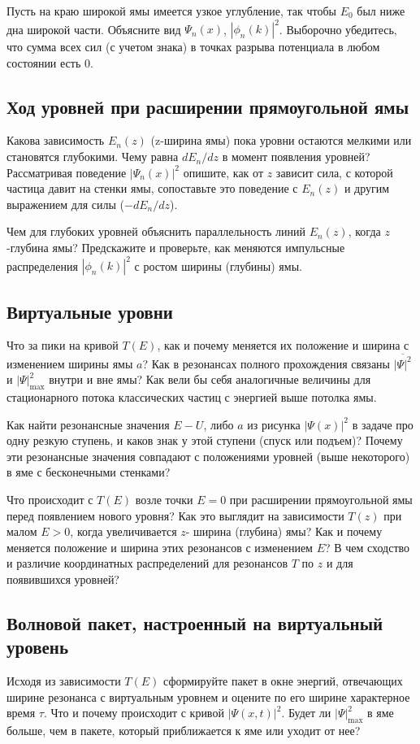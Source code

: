 \documentclass[12pt]{article}
\begin{document}
Пусть на краю широкой ямы имеется узкое углубление, так чтобы
$E_0$ был ниже дна широкой части. Объясните вид $\Psi_n (x)$, $|
\phi_n(k)|^2$. Выборочно убедитесь, что сумма всех сил (с учетом
знака) в точках разрыва потенциала в любом состоянии есть 0.

\hypertarget{well-En-of-z}{}\subsection{Ход уровней при
расширении прямоугольной ямы}
Какова зависимость $E_n (z)$ (z-ширина ямы) пока уровни остаются
мелкими или становятся глубокими. Чему равна $dE_n/dz$ в момент
появления уровней? Рассматривая поведение $|\Psi_n (x)|^2$
опишите, как от $z$ зависит сила, с которой частица давит на
стенки ямы, сопоставьте это поведение с $E_n (z)$ и другим
выражением для силы ($-dE_n/dz$).

Чем для глубоких уровней
объяснить параллельность линий $E_n(z)$, когда $z$-глубина ямы?
Предскажите и проверьте, как меняются импульсные распределения $|
\phi_n(k)|^2$ с ростом ширины (глубины) ямы.

\hypertarget{well_T(z)}{}\subsection{Виртуальные уровни}
Что за пики на кривой $T(E)$, как и почему меняется их положение
и ширина с изменением ширины ямы $a$? Как в резонансах полного  прохождения связаны $\overline{|\Psi|^2}$ и $|\Psi|^2_{\max}$ внутри и вне ямы? Как вели бы себя аналогичные величины для стационарного потока классических частиц с энергией выше потолка ямы.

Как найти резонансные значения $E-U$, либо $a$ из рисунка $|\Psi(x)|^2$ в задаче про одну резкую ступень, и каков знак у этой ступени (спуск или подъем)? Почему эти резонансные значения совпадают с положениями уровней (выше некоторого) в яме с бесконечными стенками?

Что происходит с $T(E)$ возле
точки $E=0$ при расширении прямоугольной ямы перед появлением
нового уровня? Как это выглядит на зависимости $T(z)$ при малом
$E>0$, когда увеличивается $z$- ширина (глубина) ямы? Как и
почему меняется положение и ширина этих резонансов с изменением $E$? В чем сходство и различие координатных
распределений для резонансов $T$ по $z$ и для появившихся
уровней?

\hypertarget{WP_virtual}{}\subsection{Волновой пакет,
настроенный на виртуальный уровень}
Исходя из зависимости $T(E)$ сформируйте пакет в окне энергий, отвечающих ширине резонанса с виртуальным уровнем и оцените по его ширине характерное время $\tau$. Что и почему  происходит с
кривой $|\Psi (x,t)|^2$. Будет ли $|\Psi|_{\max}^2$ в яме больше, чем в пакете, который приближается к яме или уходит от нее?
\end{document}

